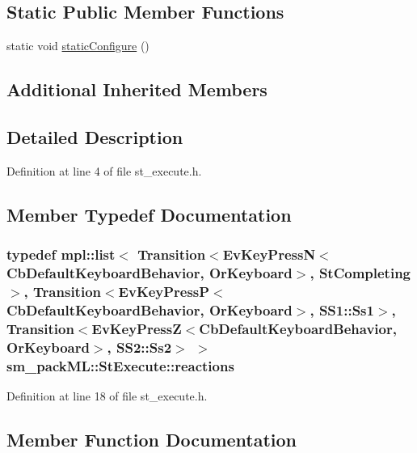 \subsection*{Static Public Member Functions}
\begin{DoxyCompactItemize}
\item 
static void \hyperlink{structsm__packML_1_1StExecute_aa6be62163d90d338b72d08c3837fb97c}{static\+Configure} ()
\end{DoxyCompactItemize}
\subsection*{Additional Inherited Members}


\subsection{Detailed Description}


Definition at line 4 of file st\+\_\+execute.\+h.



\subsection{Member Typedef Documentation}
\subsubsection[{\texorpdfstring{reactions}{reactions}}]{\setlength{\rightskip}{0pt plus 5cm}typedef mpl\+::list$<$ Transition$<$Ev\+Key\+PressN$<$Cb\+Default\+Keyboard\+Behavior, {\bf Or\+Keyboard}$>$, {\bf St\+Completing}$>$, Transition$<$Ev\+Key\+PressP$<$Cb\+Default\+Keyboard\+Behavior, {\bf Or\+Keyboard}$>$, {\bf S\+S1\+::\+Ss1}$>$, Transition$<$Ev\+Key\+PressZ$<$Cb\+Default\+Keyboard\+Behavior, {\bf Or\+Keyboard}$>$, {\bf S\+S2\+::\+Ss2}$>$ $>$ {\bf sm\+\_\+pack\+M\+L\+::\+St\+Execute\+::reactions}}\hypertarget{structsm__packML_1_1StExecute_ade2bd54ab70b2dee61964b43eaaf0de5}{}\label{structsm__packML_1_1StExecute_ade2bd54ab70b2dee61964b43eaaf0de5}


Definition at line 18 of file st\+\_\+execute.\+h.



\subsection{Member Function Documentation}

